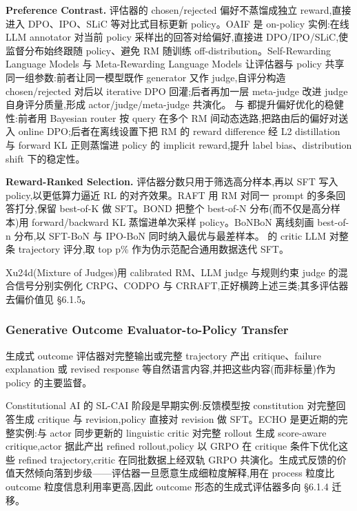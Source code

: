 \textbf{Preference Contrast.} 评估器的 chosen/rejected 偏好不蒸馏成独立 reward,直接进入 DPO、IPO、SLiC 等对比式目标更新 policy。OAIF \cite{Guo24} 是 on-policy 实例:在线 LLM annotator 对当前 policy 采样出的回答对给偏好,直接进 DPO/IPO/SLiC,使监督分布始终跟随 policy、避免 RM 随训练 off-distribution。Self-Rewarding Language Models \cite{Yua24} 与 Meta-Rewarding Language Models \cite{Wu24d} 让评估器与 policy 共享同一组参数:前者让同一模型既作 generator 又作 judge,自评分构造 chosen/rejected 对后以 iterative DPO 回灌;后者再加一层 meta-judge 改进 judge 自身评分质量,形成 actor/judge/meta-judge 共演化。\cite{Wu25x} 与 \cite{Fis24} 都提升偏好优化的稳健性:前者用 Bayesian router 按 query 在多个 RM 间动态选路,把路由后的偏好对送入 online DPO;后者在离线设置下把 RM 的 reward difference 经 L2 distillation 与 forward KL 正则蒸馏进 policy 的 implicit reward,提升 label bias、distribution shift 下的稳定性。

\textbf{Reward-Ranked Selection.} 评估器分数只用于筛选高分样本,再以 SFT 写入 policy,以更低算力逼近 RL 的对齐效果。RAFT \cite{Don23} 用 RM 对同一 prompt 的多条回答打分,保留 best-of-K 做 SFT。BOND \cite{Ses24} 把整个 best-of-N 分布(而不仅是高分样本)用 forward/backward KL 蒸馏进单次采样 policy。BoNBoN \cite{Gui24} 离线刻画 best-of-n 分布,以 SFT-BoN 与 IPO-BoN 同时纳入最优与最差样本。\cite{Gon24b} 的 critic LLM 对整条 trajectory 评分,取 top p\% 作为伪示范配合通用数据迭代 SFT。

Xu24d(Mixture of Judges)用 calibrated RM、LLM judge 与规则约束 judge 的混合信号分别实例化 CRPG、CODPO 与 CRRAFT,正好横跨上述三类;其多评估器去偏价值见 §6.1.5。

\subsubsection{Generative Outcome Evaluator-to-Policy Transfer}

生成式 outcome 评估器对完整输出或完整 trajectory 产出 critique、failure explanation 或 revised response 等自然语言内容,并把这些内容(而非标量)作为 policy 的主要监督。

Constitutional AI \cite{Bai22b} 的 SL-CAI 阶段是早期实例:反馈模型按 constitution 对完整回答生成 critique 与 revision,policy 直接对 revision 做 SFT。ECHO \cite{Li26l} 是更近期的完整实例:与 actor 同步更新的 linguistic critic 对完整 rollout 生成 score-aware critique,actor 据此产出 refined rollout,policy 以 GRPO 在 critique 条件下优化这些 refined trajectory,critic 在同批数据上经双轨 GRPO 共演化。生成式反馈的价值天然倾向落到步级——评估器一旦愿意生成细粒度解释,用在 process 粒度比 outcome 粒度信息利用率更高,因此 outcome 形态的生成式评估器多向 §6.1.4 迁移。

